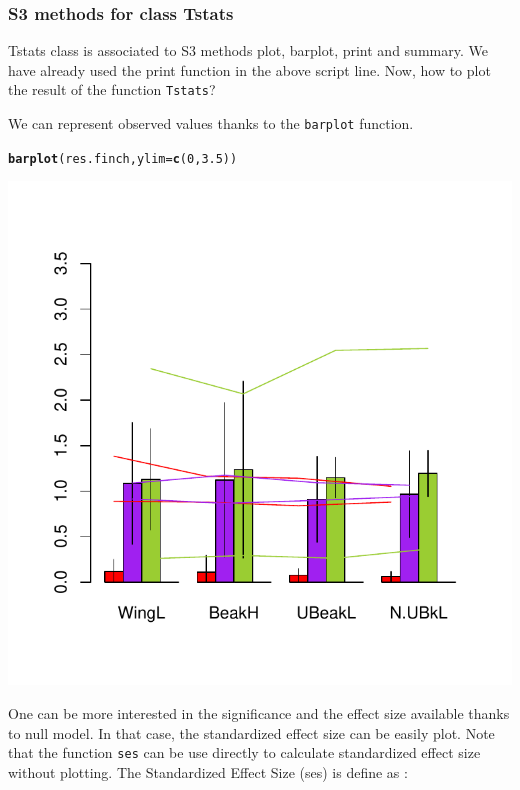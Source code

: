 \documentclass[12pt]{article}\usepackage[]{graphicx}\usepackage[]{color}
\makeatletter
\def\maxwidth{ %
  \ifdim\Gin@nat@width>\linewidth
    \linewidth
  \else
    \Gin@nat@width
  \fi
}
\newcommand{\hlnum}[1]{\textcolor[rgb]{0.686,0.059,0.569}{#1}}%
\newcommand{\hlstd}[1]{\textcolor[rgb]{0.345,0.345,0.345}{#1}}%
\newcommand{\hlkwc}[1]{\textcolor[rgb]{0.333,0.667,0.333}{#1}}%
\newcommand{\hlkwd}[1]{\textcolor[rgb]{0.737,0.353,0.396}{\textbf{#1}}}%
\newenvironment{kframe}{%
 \def\at@end@of@kframe{}%
 \ifinner\ifhmode%
  \def\at@end@of@kframe{\end{minipage}}%
  \begin{minipage}{\columnwidth}%
 \fi\fi%
 \def\FrameCommand##1{\hskip\@totalleftmargin \hskip-\fboxsep
 \colorbox{shadecolor}{##1}\hskip-\fboxsep
     \hskip-\linewidth \hskip-\@totalleftmargin \hskip\columnwidth}%
 \MakeFramed {\advance\hsize-\width
   \@totalleftmargin\z@ \linewidth\hsize
   \@setminipage}}%
 {\par\unskip\endMakeFramed%
 \at@end@of@kframe}
\newenvironment{knitrout}{}{} %
\makeatother
\begin{document}
\subsubsection{S3 methods for class Tstats}
Tstats class is associated to S3 methods plot, barplot, print and summary. We have already used the print function in the above script line. Now, how to plot the result of the function \texttt{Tstats}?

We can represent observed values thanks to the \texttt{barplot} function.
\begin{knitrout}
\color{fgcolor}\begin{kframe}
\begin{alltt}
\hlkwd{barplot}\hlstd{(res.finch,} \hlkwc{ylim} \hlstd{=} \hlkwd{c}\hlstd{(}\hlnum{0}\hlstd{,}\hlnum{3.5}\hlstd{))}
\end{alltt}
\end{kframe}

{\centering \includegraphics[width=\maxwidth]{figure/unnamed-chunk-33} 

}



\end{knitrout}

One can be more interested in the significance  and the effect size available thanks to null model. In that case, the standardized effect size can be easily plot. Note that the function \texttt{ses} can be use directly to calculate standardized effect size without plotting. The Standardized Effect Size (ses) is define as : 
\end{document}
